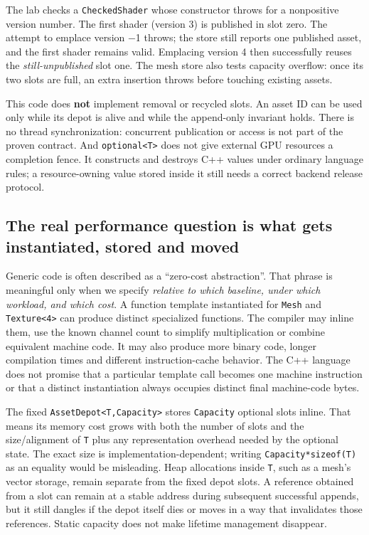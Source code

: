 The lab checks a \texttt{CheckedShader} whose constructor throws for a nonpositive version number. The first shader (version 3) is published in slot zero. The attempt to emplace version −1 throws; the store still reports one published asset, and the first shader remains valid. Emplacing version 4 then successfully reuses the \emph{still-unpublished} slot one. The mesh store also tests capacity overflow: once its two slots are full, an extra insertion throws before touching existing assets.

This code does \textbf{not} implement removal or recycled slots. An asset ID can be used only while its depot is alive and while the append-only invariant holds. There is no thread synchronization: concurrent publication or access is not part of the proven contract. And \texttt{optional\textless{}T\textgreater{}} does not give external GPU resources a completion fence. It constructs and destroys C++ values under ordinary language rules; a resource-owning value stored inside it still needs a correct backend release protocol.

\subsection{The real performance question is what gets instantiated, stored and moved}\label{05-engine-i-ch005-the-real-performance-question-is-what-gets-instantiated-stored-and-moved}

Generic code is often described as a ``zero-cost abstraction''. That phrase is meaningful only when we specify \emph{relative to which baseline, under which workload, and which cost}. A function template instantiated for \texttt{Mesh} and \texttt{Texture\textless{}4\textgreater{}} can produce distinct specialized functions. The compiler may inline them, use the known channel count to simplify multiplication or combine equivalent machine code. It may also produce more binary code, longer compilation times and different instruction-cache behavior. The C++ language does not promise that a particular template call becomes one machine instruction or that a distinct instantiation always occupies distinct final machine-code bytes.

The fixed \texttt{AssetDepot\textless{}T,Capacity\textgreater{}} stores \texttt{Capacity} optional slots inline. That means its memory cost grows with both the number of slots and the size/alignment of \texttt{T} plus any representation overhead needed by the optional state. The exact size is implementation-dependent; writing \texttt{Capacity*sizeof(T)} as an equality would be misleading. Heap allocations inside \texttt{T}, such as a mesh's vector storage, remain separate from the fixed depot slots. A reference obtained from a slot can remain at a stable address during subsequent successful appends, but it still dangles if the depot itself dies or moves in a way that invalidates those references. Static capacity does not make lifetime management disappear.


